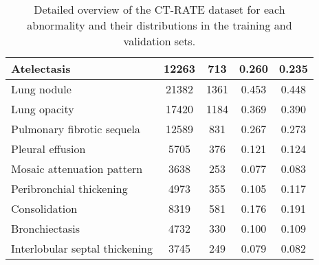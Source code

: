 \begin{table*}[!th]
\begin{center}
\begin{tabular}{|l|c|c|c|c|}
Atelectasis                        & 12263                                          & 713                                                 & 0.260                              & 0.235                                   \\ \hline
Lung nodule                        & 21382                                          & 1361                                                & 0.453                              & 0.448                                   \\ \hline
Lung opacity                       & 17420                                          & 1184                                                & 0.369                              & 0.390                                   \\ \hline
Pulmonary fibrotic sequela         & 12589                                          & 831                                                 & 0.267                              & 0.273                                   \\ \hline
Pleural effusion                   & 5705                                           & 376                                                 & 0.121                              & 0.124                                   \\ \hline
Mosaic attenuation pattern         & 3638                                           & 253                                                 & 0.077                              & 0.083                                   \\ \hline
Peribronchial thickening           & 4973                                           & 355                                                 & 0.105                              & 0.117                                   \\ \hline
Consolidation                      & 8319                                           & 581                                                 & 0.176                              & 0.191                                   \\ \hline
Bronchiectasis                     & 4732                                           & 330                                                 & 0.100                              & 0.109                                   \\ \hline
Interlobular septal thickening     & 3745                                           & 249                                                 & 0.079                              & 0.082                                   \\ \hline
\end{tabular}
\label{table1}
\end{center}
\caption{\label{ctrate} Detailed overview of the CT-RATE dataset for each abnormality and their distributions in the training and validation sets. \cite{hamamci2024foundation}}
\end{table*}